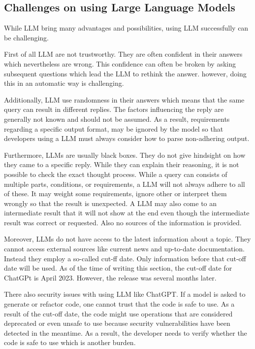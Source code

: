 \subsection{Challenges on using Large Language Models}\label{sec:llm_challenges}

While LLM bring many advantages  and possibilities, using \ac{LLM}  successfully can be challenging. 

First of all \ac{LLM} are not trustworthy. They are often confident in their answers which nevertheless are wrong. This confidence can often be broken by asking subsequent questions which lead the \ac{LLM} to rethink the answer. however, doing this in an automatic way is challenging.

Additionally, \ac{LLM} use randomness in their answers which means that the same query can result in different replies. The factors influencing the reply are generally not known and should not be assumed. As a result, requirements regarding a specific output format, may be ignored by the model so that developers using a \ac{LLM} must always consider how to parse non-adhering output. 

Furthermore, \ac{LLM}s are usually black boxes. They do not give hindsight on how they came to a specific reply. While they can explain their reasoning, it is not possible to check the exact thought process.
While a query can consists of multiple parts, conditions, or requirements, a \ac{LLM} will not always adhere to all of these. It may weight some requirements, ignore other or interpret them wrongly so that the result is unexpected. A \ac{LLM} may also come to an intermediate result that it will not show at the end even though the intermediate result was correct or requested. Also no sources of the information is provided. 

Moreover, \ac{LLM}s do not have access to the latest information about a topic. They cannot access external sources like current news  and up-to-date documentation. Instead they employ a so-called cut-ff date. Only information before that cut-off date will be used. As of the time of writing this section, the cut-off date for ChatGPt is April  2023. However, the release was several months later.  

There also security issues with using  \ac{LLM} like ChatGPT. If a model is asked to generate or refactor code, one cannot trust that the code is safe to use. As a result of the cut-off date, the code might use operations that are considered deprecated or even unsafe to use because security vulnerabilities have been detected in the meantime. As a result, the developer needs to verify whether the code is safe to use which is another burden. 

